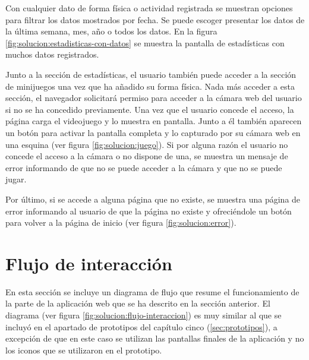 
Con cualquier dato de forma física o actividad registrada se muestran opciones para filtrar los
datos mostrados por fecha. Se puede escoger presentar los datos de la última semana, mes, año o
todos los datos. En la figura \ref{fig:solucion:estadisticas-con-datos} se muestra la pantalla de
estadísticas con muchos datos registrados.


Junto a la sección de estadísticas, el usuario también puede acceder a la sección de minijuegos una
vez que ha añadido su forma física. Nada más acceder a esta sección, el navegador solicitará
permiso para acceder a la cámara web del usuario si no se ha concedido previamente. Una vez que
el usuario concede el acceso, la página carga el videojuego y lo muestra en pantalla. Junto a él
también aparecen un botón para activar la pantalla completa y lo capturado por su cámara web en
una esquina (ver figura \ref{fig:solucion:juego}). Si por alguna razón el usuario no concede el
acceso a la cámara o no dispone de una, se muestra un mensaje de error informando de que no se
puede acceder a la cámara y que no se puede jugar.


Por último, si se accede a alguna página que no existe, se muestra una página de error informando
al usuario de que la página no existe y ofreciéndole un botón para volver a la página de inicio
(ver figura \ref{fig:solucion:error}).


\section{Flujo de interacción}
\label{sec:flujo-interaccion}
En esta sección se incluye un diagrama de flujo que resume el funcionamiento de la parte de la
aplicación web que se ha descrito en la sección anterior. El diagrama (ver figura
\ref{fig:solucion:flujo-interaccion}) es muy similar al que se incluyó en el apartado de prototipos
del capítulo cinco (\ref{sec:prototipos}), a excepción de que en este caso se utilizan las pantallas
finales de la aplicación y no los iconos que se utilizaron en el prototipo.


